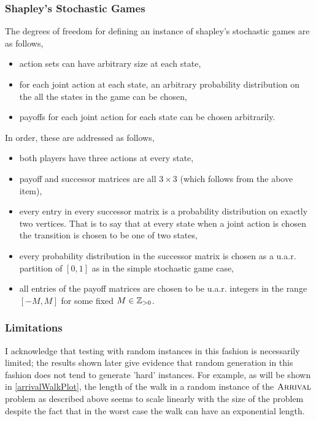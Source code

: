 \subsubsection{Shapley's Stochastic Games} \label{shapleyRandom}
The degrees of freedom for defining an instance of shapley's stochastic games are as follows,
\begin{itemize}
  \item action sets can have arbitrary size at each state,
  \item for each joint action at each state, an arbitrary probability distribution on the all
    the states in the game can be chosen,
  \item payoffs for each joint action for each state can be chosen arbitrarily.
\end{itemize}
In order, these are addressed as follows,
\begin{itemize}
  \item both players have three actions at every state,
  \item payoff and successor matrices are all $3 \times 3$ (which follows from the above item),
  \item every entry in every successor matrix is a probability distribution on exactly two vertices.
    That is to say that at every state when a joint action is chosen the transition is chosen
    to be one of two states,
  \item every probability distribution in the successor matrix is chosen as a u.a.r. partition of $[0, 1]$
    as in the simple stochastic game case,
  \item all entries of the payoff matrices are chosen to be u.a.r. integers in the range $[-M, M]$ for some
    fixed $M \in \mathbb{Z}_{> 0}$.
\end{itemize}
\subsubsection{Limitations}
I acknowledge that testing with random instances in this fashion is necessarily limited; the results
shown later give evidence that random generation in this fashion does not tend to generate 'hard' instances.
For example, as will be shown in \cref{arrivalWalkPlot}, the length of the walk in a random instance
of the $\textsc{Arrival}$ problem as described above seems to scale linearly with the size of the problem despite
the fact that in the worst case the walk can have an exponential length.

